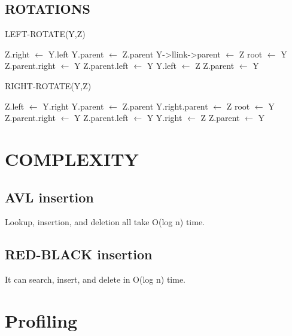 \documentclass{article}
\begin{document}
\subsection{ROTATIONS}
\begin{algorithm}
\caption{LEFT-ROTATE(Y,Z)}
\begin{algorithmic}
{
	\STATE Z.right {$\leftarrow$} Y.left
	\STATE Y.parent {$\leftarrow$} Z.parent
		\STATE Y->llink->parent {$\leftarrow$} Z
	\ENDIF
		\STATE root {$\leftarrow$} Y
		\STATE Z.parent.right {$\leftarrow$} Y
		\ELSE 
			\STATE Z.parent.left {$\leftarrow$} Y	
	\ENDIF
	\STATE Y.left {$\leftarrow$} Z
	\STATE Z.parent {$\leftarrow$} Y		
}
\end{algorithmic}
\end{algorithm}
\begin{algorithm}
\caption{RIGHT-ROTATE(Y,Z)}
\begin{algorithmic}
{
	\STATE Z.left {$\leftarrow$} Y.right
	\STATE Y.parent {$\leftarrow$} Z.parent
	    \STATE Y.right.parent {$\leftarrow$} Z
	\ENDIF
		\STATE root {$\leftarrow$} Y
		\STATE Z.parent.right {$\leftarrow$} Y
		\ELSE 
			\STATE Z.parent.left {$\leftarrow$} Y
	\ENDIF
	\STATE Y.right {$\leftarrow$} Z
	\STATE Z.parent {$\leftarrow$} Y
}
\end{algorithmic}
\end{algorithm}
\newpage
\section{COMPLEXITY}
\subsection{AVL insertion}
Lookup, insertion, and deletion all take O(log n) time.
\subsection{RED-BLACK insertion}
It can search, insert, and delete in O(log n) time.
\section{Profiling}
\end{document}

